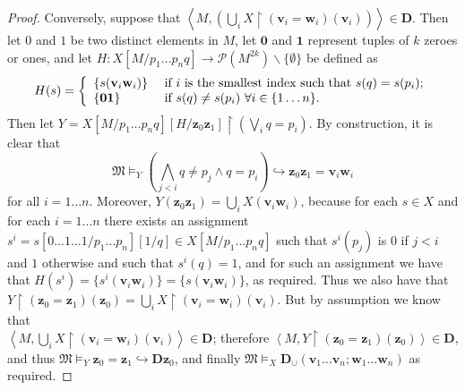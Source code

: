 \documentclass{article}
\theoremstyle{definition}
\newcommand{\tuple}{\mathbf}
\newcommand{\M}{\mathfrak M}
\newcommand{\D}{\mathbf D}
\newcommand{\parts}{\mathcal P}
\begin{document}
\begin{proof}
	Conversely, suppose that $\left \langle M, \left(\bigcup_i X\upharpoonright (\tuple v_i = \tuple w_i)(\tuple v_i)\right)\right \rangle \in \D$. Then let $0$ and $1$ be two distinct elements in $M$, let $\tuple 0$ and $\tuple 1$ represent tuples of $k$ zeroes or ones, and let $H: X[M/p_1 \ldots p_n q]\rightarrow \parts(M^{2k}) \backslash \{\emptyset\}$ be defined as 
\[
	H(s) = \left\{\begin{array}{l l}
		\{s(\tuple v_i \tuple w_i)\} & \text{ if } i \text{ is the smallest index such that } s(q) = s(p_i);\\
		\{\tuple 0\tuple 1\} & \text{ if } s(q) \not = s(p_i) ~\forall i \in \{1 \ldots n\}.
	\end{array}
\right.
\]
	Then let $Y = X[M/p_1 \ldots p_n q][H/\tuple z_0 \tuple z_1]\upharpoonright \left(\bigvee_i q = p_i\right)$. By construction, it is clear that 
	\[
		\M \models_Y \left (\bigwedge_{j < i} q \not = p_j \wedge q = p_i \right) \hookrightarrow \tuple z_0 \tuple z_1 = \tuple v_i \tuple w_i
	\]
	for all $i = 1 \ldots n$. 
	Moreover, $Y(\tuple z_0 \tuple z_1) = \bigcup_i X(\tuple v_i \tuple w_i)$, because for each $s \in X$ and for each $i = 1 \ldots n$ there exists an assignment $s^i = s[0 \ldots 1 \ldots 1/p_1 \ldots p_n][1/q] \in X[M/p_1 \ldots p_n q]$ such that $s^i(p_j)$ is $0$ if $j < i$ and $1$ otherwise and such that $s^i(q) = 1$, and for such an assignment we have that $H(s^i) = \{s^i(\tuple v_i \tuple w_i)\} = \{s(\tuple v_i\tuple w_i)\}$, as required. Thus we also have that $Y\upharpoonright (\tuple z_0 = \tuple z_1)(\tuple z_0) = \bigcup_i X\upharpoonright (\tuple v_i = \tuple w_i)(\tuple v_i)$. But by assumption we know that\\ $\left \langle M, \bigcup_i X\upharpoonright (\tuple v_i = \tuple w_i)(\tuple v_i)\right \rangle \in \D $; therefore $\left \langle M, Y\upharpoonright(\tuple z_0 = \tuple z_1)(\tuple z_0)\right \rangle \in \D$, and thus $\M \models_Y \tuple z_0 = \tuple z_1 \hookrightarrow \D \tuple z_0$, and finally $\M \models_X \D_\cup(\tuple v_1 \ldots \tuple v_n; \tuple w_1 \ldots \tuple w_n)$ as required.
\end{proof}
\end{document}
